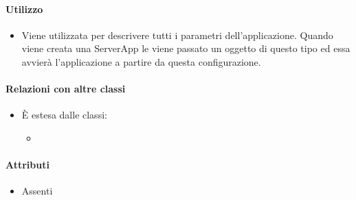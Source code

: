 \paragraph*{Utilizzo}
\begin{itemize}
\item[] Viene utilizzata per descrivere tutti i parametri dell'applicazione. Quando viene creata una ServerApp le viene passato un oggetto di questo tipo ed essa avvierà l'applicazione a partire da questa configurazione.
\end{itemize}

\paragraph*{Relazioni con altre classi}
\begin{itemize}

\item[] È estesa dalle classi:
\begin{itemize}
\item {}
\end{itemize}

\end{itemize}

\paragraph*{Attributi}
\begin{itemize}
\item[] Assenti
\end{itemize}

